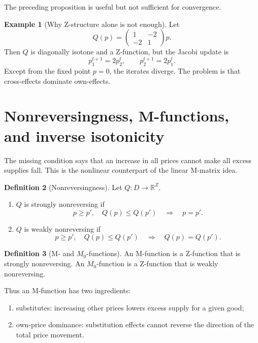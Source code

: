 \documentclass[11pt]{article}
\newcommand{\R}{\mathbb{R}}
\theoremstyle{definition}
\newtheorem{definition}{Definition}[section]
\newtheorem{example}[definition]{Example}
\theoremstyle{plain}
\begin{document}
The preceding proposition is useful but not sufficient for convergence.

\begin{example}[Why Z-structure alone is not enough]
Let
\[
        Q(p)=\begin{pmatrix}1&-2\\-2&1\end{pmatrix}p.
\]
Then $Q$ is diagonally isotone and a Z-function, but the Jacobi update is
\[
        p_1^{t+1}=2p_2^t,
        \qquad
        p_2^{t+1}=2p_1^t.
\]
Except from the fixed point $p=0$, the iterates diverge. The problem is that cross-effects dominate own-effects.
\end{example}

\section{Nonreversingness, M-functions, and inverse isotonicity}

The missing condition says that an increase in all prices cannot make all excess supplies fall. This is the nonlinear counterpart of the linear M-matrix idea.

\begin{definition}[Nonreversingness]
Let $Q:D\to\R^Z$.
\begin{enumerate}[label=(\roman*)]
\item $Q$ is strongly nonreversing if
\[
        p\geq p',\quad Q(p)\leq Q(p')
        \quad\Longrightarrow\quad p=p'.
\]
\item $Q$ is weakly nonreversing if
\[
        p\geq p',\quad Q(p)\leq Q(p')
        \quad\Longrightarrow\quad Q(p)=Q(p').
\]
\end{enumerate}
\end{definition}

\begin{definition}[M- and $M_0$-functions]
An M-function is a Z-function that is strongly nonreversing. An $M_0$-function is a Z-function that is weakly nonreversing.
\end{definition}

Thus an M-function has two ingredients:
\begin{enumerate}[label=(\alph*)]
\item substitutes: increasing other prices lowers excess supply for a given good;
\item own-price dominance: substitution effects cannot reverse the direction of the total price movement.
\end{enumerate}
\end{document}
